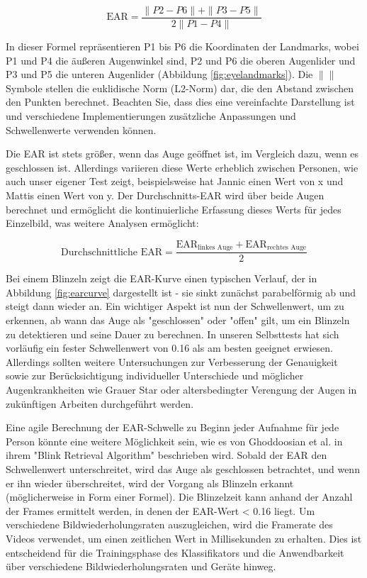 \begin{equation}
	\text{EAR} = \frac{{\|P2 - P6\| + \|P3 - P5\|}}{{2\|P1 - P4\|}}
\end{equation}

In dieser Formel repräsentieren P1 bis P6 die Koordinaten der Landmarks, wobei P1 und P4 die äußeren Augenwinkel sind, P2 und P6 die oberen Augenlider und P3 und P5 die unteren Augenlider (Abbildung \ref{fig:eyelandmarks}). Die $ \| \| $ Symbole stellen die euklidische Norm (L2-Norm) dar, die den Abstand zwischen den Punkten berechnet. Beachten Sie, dass dies eine vereinfachte Darstellung ist und verschiedene Implementierungen zusätzliche Anpassungen und Schwellenwerte verwenden können.

Die EAR ist stets größer, wenn das Auge geöffnet ist, im Vergleich dazu, wenn es geschlossen ist. Allerdings variieren diese Werte erheblich zwischen Personen, wie auch unser eigener Test zeigt, beispielsweise hat Jannic einen Wert von x und Mattis einen Wert von y. Der Durchschnitts-EAR wird über beide Augen berechnet und ermöglicht die kontinuierliche Erfassung dieses Werts für jedes Einzelbild, was weitere Analysen ermöglicht:

\begin{equation}
	\text{Durchschnittliche EAR} = \frac{{\text{EAR}_{\text{linkes Auge}} + \text{EAR}_{\text{rechtes Auge}}}}{2}
\end{equation}

Bei einem Blinzeln zeigt die EAR-Kurve einen typischen Verlauf, der in Abbildung \ref{fig:earcurve} dargestellt ist - sie sinkt zunächst parabelförmig ab und steigt dann wieder an. Ein wichtiger Aspekt ist nun der Schwellenwert, um zu erkennen, ab wann das Auge als "geschlossen" oder "offen" gilt, um ein Blinzeln zu detektieren und seine Dauer zu berechnen. In unseren Selbsttests hat sich vorläufig ein fester Schwellenwert von 0.16 als am besten geeignet erwiesen. Allerdings sollten weitere Untersuchungen zur Verbesserung der Genauigkeit sowie zur Berücksichtigung individueller Unterschiede und möglicher Augenkrankheiten wie Grauer Star oder altersbedingter Verengung der Augen in zukünftigen Arbeiten durchgeführt werden.

Eine agile Berechnung der EAR-Schwelle zu Beginn jeder Aufnahme für jede Person könnte eine weitere Möglichkeit sein, wie es von Ghoddoosian et al. \cite{GH19} in ihrem "Blink Retrieval Algorithm" beschrieben wird. Sobald der EAR den Schwellenwert unterschreitet, wird das Auge als geschlossen betrachtet, und wenn er ihn wieder überschreitet, wird der Vorgang als Blinzeln erkannt (möglicherweise in Form einer Formel). Die Blinzelzeit kann anhand der Anzahl der Frames ermittelt werden, in denen der EAR-Wert < 0.16 liegt. Um verschiedene Bildwiederholungsraten auszugleichen, wird die Framerate des Videos verwendet, um einen zeitlichen Wert in Millisekunden zu erhalten. Dies ist entscheidend für die Trainingsphase des Klassifikators und die Anwendbarkeit über verschiedene Bildwiederholungsraten und Geräte hinweg.


